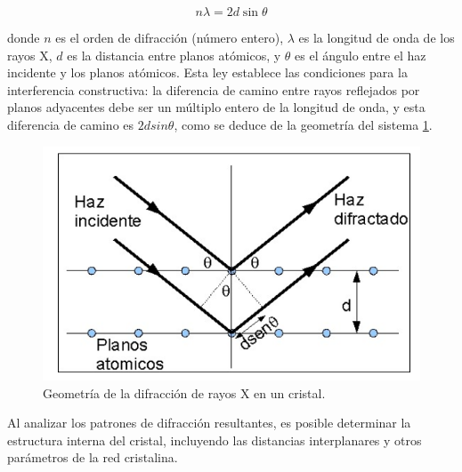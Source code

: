 \begin{equation} \label{eq:bragg}
n\lambda = 2d \sin \theta
\end{equation}

\vspace{\baselineskip}


donde $n$ es el orden de difracción (número entero), $\lambda$ es la longitud de onda de los rayos X, $d$ es la distancia entre planos atómicos, y $\theta$ es el ángulo entre el haz incidente y los planos atómicos.  Esta ley establece las condiciones para la interferencia constructiva: la diferencia de camino entre rayos reflejados por planos adyacentes debe ser un múltiplo entero de la longitud de onda, y esta diferencia de camino es $2d sin \theta$, como se deduce de la geometría del sistema \ref{fig:difraccion}.

\begin{figure}[H]
\centering
	\begin{minipage}{0.50\textwidth} 
		\includegraphics[width=\textwidth]{grafico_2x01_diffraction.png}
		\caption{\footnotesize Geometría de la difracción de rayos X en un cristal.}
		\label{fig:difraccion}
	\end{minipage}
\end{figure}

\vspace{\baselineskip}

Al analizar los patrones de difracción resultantes, es posible determinar la estructura interna del cristal, incluyendo las distancias interplanares y otros parámetros de la red cristalina.


